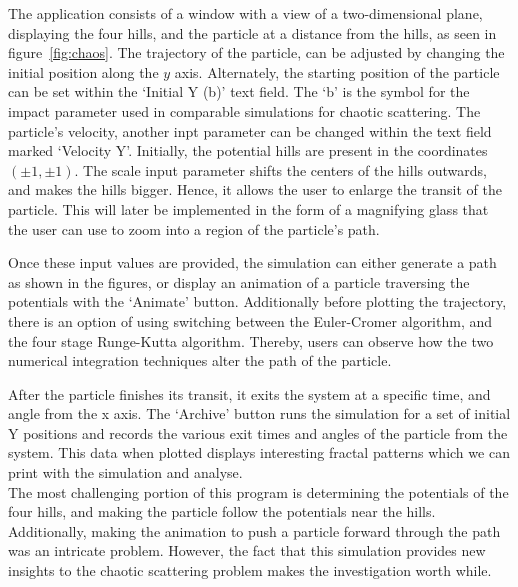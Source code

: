 \documentclass{article}
\begin{document}
{{	The application consists of a window with a view of a two-dimensional plane, displaying the four hills, and the particle at a distance from the hills, as seen in figure~\ref{fig:chaos}. The trajectory of the particle, can be adjusted by changing the initial position along the $y$ axis. Alternately, the starting position of the particle can be set within the `Initial Y (b)' text field. The `b' is the symbol for the impact parameter used in comparable simulations for chaotic scattering. The particle's velocity, another inpt parameter can be changed within the text field marked `Velocity Y'. Initially, the potential hills are present in the coordinates $(\pm 1, \pm 1)$. The scale input parameter shifts the centers of the hills outwards, and makes the hills bigger. Hence, it allows the user to enlarge the transit of the particle. This will later be implemented in the form of a magnifying glass that the user can use to zoom into a region of the particle's path.
	
	Once these input values are provided, the simulation can either generate a path as shown in the figures, or display an animation of a particle traversing the potentials with the `Animate' button. Additionally before plotting the trajectory, there is an option of using switching between the Euler-Cromer algorithm, and the four stage Runge-Kutta algorithm. Thereby, users can observe how the two numerical integration techniques alter the path of the particle. 
	
	After the particle finishes its transit, it exits the system at a specific time, and angle from the x axis. The `Archive' button runs the simulation for a set of initial Y positions and records the various exit times and angles of the particle from the  system. This data when plotted displays interesting fractal patterns which we can print with the simulation and analyse.\\
	
	
	The most challenging portion of this program is determining the potentials of the four hills, and making the particle follow the potentials near the hills. Additionally, making the animation to push a particle forward through the path was an intricate problem. However, the fact that this simulation provides new insights to the chaotic scattering problem makes the investigation worth while. 
	
	
	}






}
\end{document}
